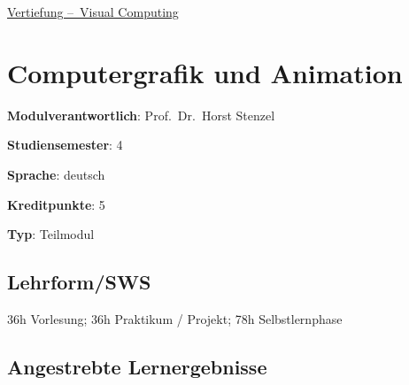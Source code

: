 \hyperref[/mi-2017/modulbeschreibungen-bachelor/BA_Vertiefung-Visual-Computing]{Vertiefung – Visual Computing}

\hypertarget{computergrafik-und-animationpathlabelmi-2017modulbeschreibungen-bachelorba_vc-computergrafik-und-animation}{%
\chapter{Computergrafik und
Animation\label{/mi-2017/modulbeschreibungen-bachelor/BA_VC-computergrafik-und-animation}}\label{computergrafik-und-animationpathlabelmi-2017modulbeschreibungen-bachelorba_vc-computergrafik-und-animation}}

\begin{modulHead}
\textbf{Modulverantwortlich}: Prof.~Dr.~Horst
Stenzel
\end{modulHead}
\begin{modulHead}
\textbf{Studiensemester}:
4
\end{modulHead}
\begin{modulHead}
\textbf{Sprache}:
deutsch
\end{modulHead}
\begin{modulHead}
\textbf{Kreditpunkte}:
5
\end{modulHead}
\begin{modulHead}
\textbf{Typ}:
Teilmodul
\end{modulHead}


\hypertarget{lehrformswspathlabelmi-2017modulbeschreibungen-bachelorba_vc-computergrafik-und-animation}{%
\section*{Lehrform/SWS\label{/mi-2017/modulbeschreibungen-bachelor/BA_VC-computergrafik-und-animation}}\label{lehrformswspathlabelmi-2017modulbeschreibungen-bachelorba_vc-computergrafik-und-animation}}

36h Vorlesung; 36h Praktikum / Projekt; 78h Selbstlernphase

\hypertarget{angestrebte-lernergebnissepathlabelmi-2017modulbeschreibungen-bachelorba_vc-computergrafik-und-animation}{%
\section*{Angestrebte
Lernergebnisse\label{/mi-2017/modulbeschreibungen-bachelor/BA_VC-computergrafik-und-animation}}\label{angestrebte-lernergebnissepathlabelmi-2017modulbeschreibungen-bachelorba_vc-computergrafik-und-animation}}

